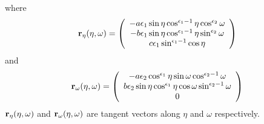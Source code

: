 \documentclass[]{article}
\begin{document}
where\
\begin{equation}
{\bf r}_{\eta}(\eta, \omega) =
\left(
\begin{array}{c}
-a\epsilon_1\sin\eta\cos^{\epsilon_1-1}\eta\cos^{\epsilon_2}\omega\\
-b\epsilon_1\sin\eta\cos^{\epsilon_1-1}\eta\sin^{\epsilon_2}\omega\\
c{\epsilon_1}\sin^{\epsilon_1 - 1}\cos{\eta}
\end{array}
\right)
\end{equation}
and
\begin{equation}
{\bf r}_{\omega}(\eta, \omega) =
\left(
\begin{array}{c}
-a\epsilon_2\cos^{\epsilon_1}\eta\sin\omega\cos^{\epsilon_2 - 1}\omega\\
b\epsilon_2\sin\eta\cos^{\epsilon_1}\eta\cos\omega\sin^{\epsilon_2 - 1}\omega\\
0
\end{array}
\right)
\end{equation}
${\bf r}_{\eta}(\eta, \omega)$ and ${\bf r}_{\omega}(\eta, \omega)$ are tangent vectors along $\eta$ and $\omega$ respectively.
\end{document}
